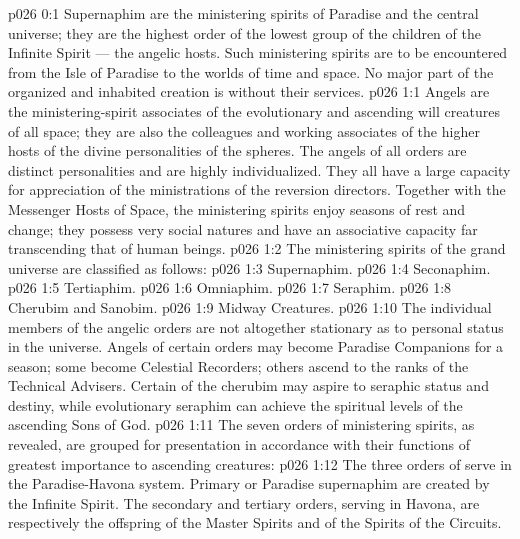 \author{Perfector of Wisdom}
\vs p026 0:1 Supernaphim are the ministering spirits of Paradise and the central universe; they are the highest order of the lowest group of the children of the Infinite Spirit --- the angelic hosts. Such ministering spirits are to be encountered from the Isle of Paradise to the worlds of time and space. No major part of the organized and inhabited creation is without their services.
\vs p026 1:1 Angels are the ministering\hyp{}spirit associates of the evolutionary and ascending will creatures of all space; they are also the colleagues and working associates of the higher hosts of the divine personalities of the spheres. The angels of all orders are distinct personalities and are highly individualized. They all have a large capacity for appreciation of the ministrations of the reversion directors. Together with the Messenger Hosts of Space, the ministering spirits enjoy seasons of rest and change; they possess very social natures and have an associative capacity far transcending that of human beings.
\vs p026 1:2 \pc The ministering spirits of the grand universe are classified as follows:
\vs p026 1:3 \bibnobreakspace Supernaphim.
\vs p026 1:4 \bibnobreakspace Seconaphim.
\vs p026 1:5 \bibnobreakspace Tertiaphim.
\vs p026 1:6 \bibnobreakspace Omniaphim.
\vs p026 1:7 \bibnobreakspace Seraphim.
\vs p026 1:8 \bibnobreakspace Cherubim and Sanobim.
\vs p026 1:9 \bibnobreakspace Midway Creatures.
\vs p026 1:10 \pc The individual members of the angelic orders are not altogether stationary as to personal status in the universe. Angels of certain orders may become Paradise Companions for a season; some become Celestial Recorders; others ascend to the ranks of the Technical Advisers. Certain of the cherubim may aspire to seraphic status and destiny, while evolutionary seraphim can achieve the spiritual levels of the ascending Sons of God.
\vs p026 1:11 \pc The seven orders of ministering spirits, as revealed, are grouped for presentation in accordance with their functions of greatest importance to ascending creatures:
\vs p026 1:12 \bibnobreakspace {} The three orders of  serve in the Paradise\hyp{}Havona system. Primary or Paradise supernaphim are created by the Infinite Spirit. The secondary and tertiary orders, serving in Havona, are respectively the offspring of the Master Spirits and of the Spirits of the Circuits.
